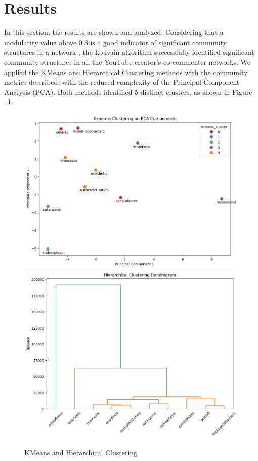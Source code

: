 \documentclass[sigconf]{acmart}
\begin{document}
\section{Results}

In this section, the results are shown and analyzed. 
Considering that a modularity value above 0.3 is a good indicator of significant
community structures in a network \cite{PhysRevE.70.066111}, the Louvain algorithm successfully 
identified significant community structures in all the YouTube creator's co-commenter networks.
We applied the KMeans and Hierarchical Clustering methods with the community metrics described, 
with the reduced complexity of the Principal Component Analysis (PCA). 
Both methods identified 5 distinct clusters, as shown in Figure ~\ref{fig:kmeans_hierarchical}.

\begin{figure}[hbt!]
    \centering
    \includegraphics[width=\linewidth]{./imgs/KMeans_PCA.png}
    \vspace{0.5cm} %
    \includegraphics[width=\linewidth]{./imgs/Hierarchical_clustering.png}
    \caption{KMeans and Hierarchical Clustering}
    \label{fig:kmeans_hierarchical}
\end{figure}
\end{document}
